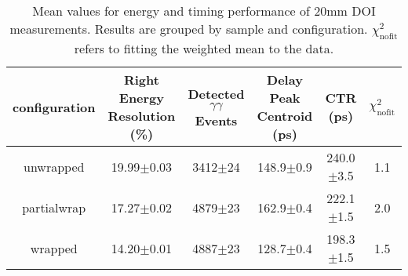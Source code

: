 \begin{table}
\caption{\label{doictrresults-20} Mean values for energy and timing performance of 20mm DOI measurements. Results are grouped by sample and configuration. $\chi^2_\text{nofit}$ refers to fitting the weighted mean to the data.}
\begin{tabular}{cccccc}
\hline
configuration & Right Energy Resolution (\%) & Detected $\gamma\gamma$ Events & Delay Peak Centroid (ps)  & CTR (ps) &  $\chi^2_\text{nofit}$ \\
\hline
        unwrapped     &  19.99$\pm$0.03 &  3412$\pm$24 &  148.9$\pm$0.9 &  240.0$\pm$3.5 &    1.1 \\
        partialwrap   &  17.27$\pm$0.02 &  4879$\pm$23 &  162.9$\pm$0.4 &  222.1$\pm$1.5 &    2.0 \\
        wrapped       &  14.20$\pm$0.01 &  4887$\pm$23 &  128.7$\pm$0.4 &  198.3$\pm$1.5 &    1.5 \\
\hline
\end{tabular}
\end{table}


